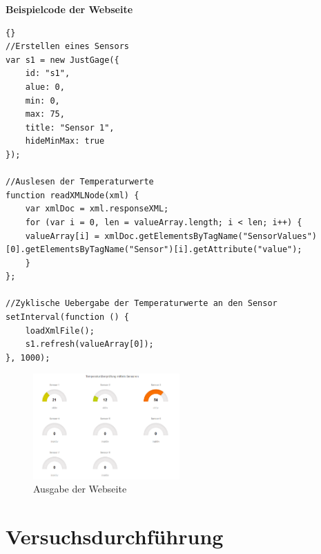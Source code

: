 \textbf{Beispielcode der Webseite}

\begin{lstlisting}{}
//Erstellen eines Sensors
var s1 = new JustGage({
	id: "s1",
	alue: 0,
    min: 0,
    max: 75,
    title: "Sensor 1",
    hideMinMax: true
});

//Auslesen der Temperaturwerte
function readXMLNode(xml) {
	var xmlDoc = xml.responseXML;
	for (var i = 0, len = valueArray.length; i < len; i++) {
	valueArray[i] = xmlDoc.getElementsByTagName("SensorValues")[0].getElementsByTagName("Sensor")[i].getAttribute("value");
	}
};

//Zyklische Uebergabe der Temperaturwerte an den Sensor
setInterval(function () {
	loadXmlFile();
	s1.refresh(valueArray[0]);
}, 1000);
\end{lstlisting}

\begin{figure}[H]%
\centering
\includegraphics[width=0.5\textwidth]{Images/Webseite.png}
\caption{Ausgabe der Webseite}
\label{fig:classdia}
\end{figure}

\section{Versuchsdurchführung}